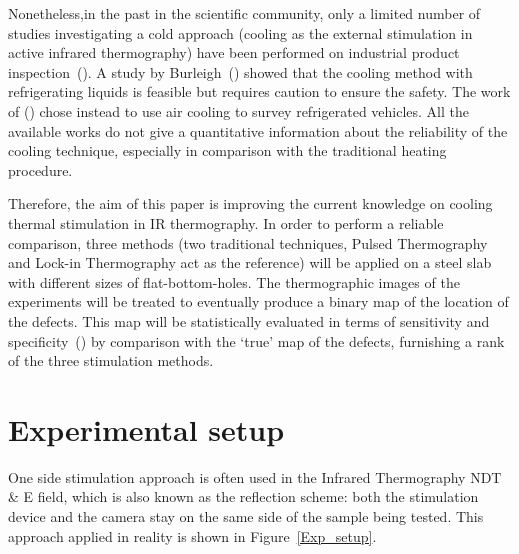 Nonetheless,in the past in the scientific community, only a limited number of studies investigating a cold approach (cooling as the external stimulation in active infrared thermography) have been performed on industrial product inspection~(\citet{endohdynamical2012,2012-LewisHom}). A study by Burleigh~(\citet{Burleigh1989Thermographic}) showed that the cooling method with refrigerating liquids is feasible but requires caution to ensure the safety.
The work of (\citet{lei2017detection}) chose instead to use air cooling to survey refrigerated vehicles. All the available works do not give a quantitative information about the reliability of the cooling technique, especially in comparison with the traditional heating procedure.

Therefore, the aim of this paper is improving the current knowledge on cooling thermal stimulation
in IR thermography. In order to perform a reliable comparison, three methods (two traditional techniques, Pulsed Thermography and Lock-in Thermography act as the reference) will be applied on a steel slab with different sizes of flat-bottom-holes. The thermographic images of the experiments will be  treated to  eventually produce a binary map of the location of the defects. This map will be statistically evaluated in terms of sensitivity and specificity~(\citet{Fawcett2006}) by comparison with the `true' map of the defects, furnishing a rank of the three stimulation methods. 

\section{Experimental setup} %
\label{sec:experimental_setup}
One side stimulation approach is often used in the Infrared Thermography NDT \& E field, which is also known as the reflection scheme: both the stimulation device and the camera stay on the same side of the sample being tested. This approach applied in reality is shown in Figure~\ref{Exp_setup}.

